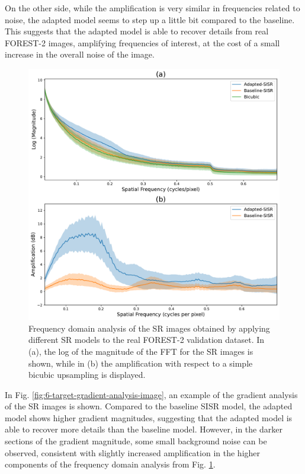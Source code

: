         On the other side, while the amplification is very similar in frequencies related to noise, the adapted model seems to step up a little bit compared to the baseline.  
        This suggests that the adapted model is able to recover details from real FOREST-2 images, amplifying frequencies of interest, at the cost of a small increase in the overall noise of the image.

        \begin{figure}[H]
            \centering
            \includegraphics[scale=0.5]{Includes/5-target-amplification-statistics.pdf}
            \caption{Frequency domain analysis of the SR images obtained by applying different SR models to the real FOREST-2 validation dataset.
            In (a), the log of the magnitude of the FFT for the SR images is shown,
            while in (b) the amplification with respect to a  simple bicubic upsampling is displayed.}
            \label{fig:5-target-amplification-statistics}
        \end{figure}


        In Fig. \ref{fig:6-target-gradient-analysis-image}, an example of the gradient analysis of the SR images is shown. 
        Compared to the baseline SISR model, the adapted model shows higher gradient magnitudes, suggesting that the adapted model is able to recover more details than the baseline model. 
        However, in the darker sections of the gradient magnitude, some small background noise can be observed, consistent with slightly increased amplification in the higher components of the frequency domain analysis from Fig. \ref{fig:5-target-amplification-statistics}.

